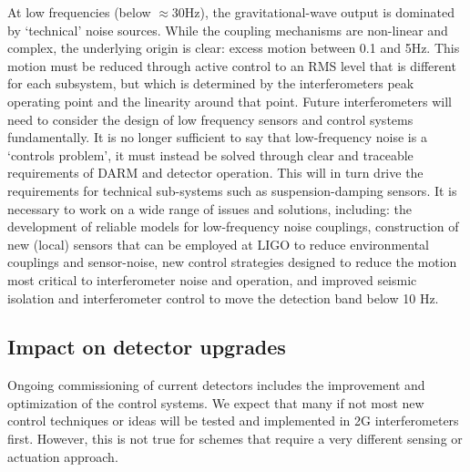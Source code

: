 \par
{}
At low frequencies (below $\approx$30Hz), the gravitational-wave output is dominated by `technical' noise sources. While the coupling mechanisms are non-linear and complex, the underlying origin is clear: excess motion between 0.1 and 5Hz. This motion must be reduced through active control to an RMS level that is different for each subsystem, but which is determined by the interferometers peak operating point and the linearity around that point.
Future interferometers will need to consider the design of low frequency sensors and control systems fundamentally. It is no longer sufficient to say that low-frequency noise is a `controls problem', it must instead be solved through clear and traceable requirements of DARM and detector operation. This will in turn drive the requirements for technical sub-systems such as suspension-damping sensors. It is necessary to work on a wide range of issues and solutions, including: the development of reliable models for low-frequency noise couplings, construction of new (local) sensors that can be employed at LIGO to reduce environmental couplings and sensor-noise, new control strategies designed to reduce the motion most critical to interferometer noise and operation, and improved seismic isolation and interferometer control to move the detection band below 10 Hz.

\subsection{Impact on detector upgrades}
Ongoing commissioning of current detectors includes the improvement and optimization of the control systems. We expect that many if not most new control techniques or ideas will be tested and implemented in 2G interferometers first. However, this is not true for schemes that require a very different sensing or actuation approach.